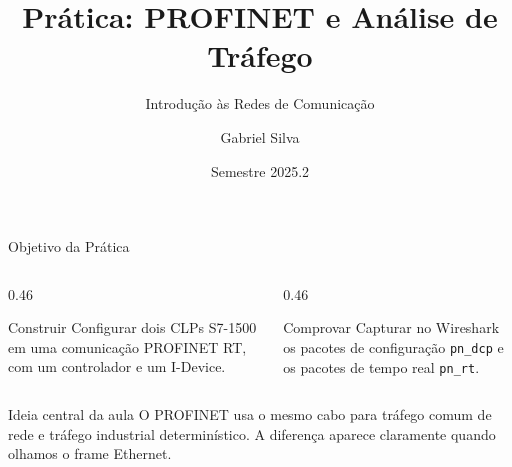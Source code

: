 \documentclass[10pt, aspectratio=169]{beamer}
\title[PROFINET]{Pr\'atica: PROFINET e An\'alise de Tr\'afego}
\subtitle{Introdu\c{c}\~ao \`as Redes de Comunica\c{c}\~ao}
\author{Gabriel Silva}
\institute{Universidade Federal de Pernambuco (UFPE)}
\date{Semestre 2025.2}
\begin{document}
\begin{frame}
    \titlepage
\end{frame}

\begin{frame}{Objetivo da Pr\'atica}
    \begin{columns}[T,totalwidth=\textwidth]
        \begin{column}{0.46\textwidth}
            \begin{block}{Construir}
                Configurar dois CLPs S7-1500 em uma comunica\c{c}\~ao \alert{PROFINET RT}, com um controlador e um I-Device.
            \end{block}
        \end{column}
        \begin{column}{0.46\textwidth}
            \begin{block}{Comprovar}
                Capturar no Wireshark os pacotes de configura\c{c}\~ao \texttt{pn\_dcp} e os pacotes de tempo real \texttt{pn\_rt}.
            \end{block}
        \end{column}
    \end{columns}

    \vspace{0.45cm}
    \begin{block}{Ideia central da aula}
        O PROFINET usa o mesmo cabo para tr\'afego comum de rede e tr\'afego industrial determin\'istico. A diferen\c{c}a aparece claramente quando olhamos o frame Ethernet.
    \end{block}
\end{frame}
\end{document}
